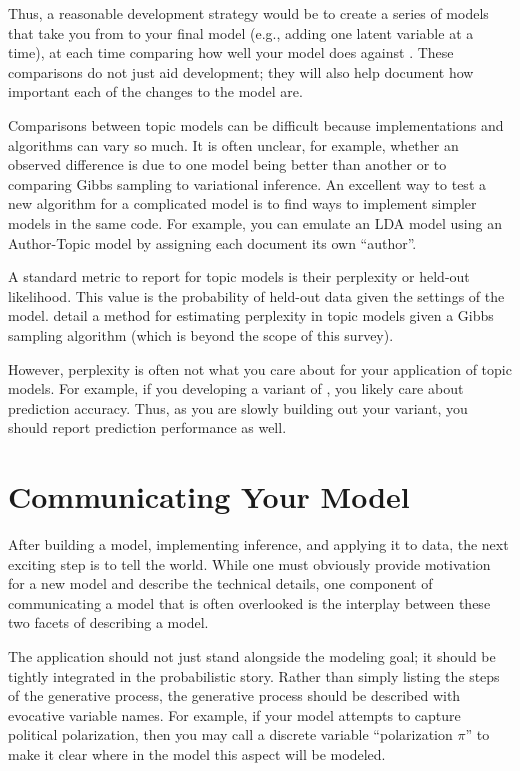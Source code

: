 Thus, a reasonable development strategy would be to create a series of
models that take you from  to your final model (e.g., adding
one latent variable at a time), at each time comparing how well your
model does against .  These comparisons do not just aid
development; they will also help document how important each of the
changes to the model are.

Comparisons between topic models can be difficult because implementations and algorithms can vary so much.
It is often unclear, for example, whether an observed difference is due to one model being better than another or to comparing Gibbs sampling to variational inference.
An excellent way to test a new algorithm for a complicated model is to find ways to implement simpler models in the same code.
For example, you can emulate an LDA model using an Author-Topic model \citep{rosen-zvi-04} by assigning each document its own ``author''.

A standard metric to report for topic models is their perplexity or
held-out likelihood.  This value is the probability of held-out data given
the settings of the model.  \citet{wallach-09a} detail a 
method for estimating perplexity in topic models given a Gibbs sampling algorithm (which is
beyond the scope of this survey).

However, perplexity is often not what you care about for your
application of topic models. For example, if you developing a variant
of , you likely care about prediction accuracy.  Thus, as
you are slowly building out your  variant, you should report
prediction performance as well.

\section{Communicating Your Model}

After building a model, implementing inference, and applying it to
data, the next exciting step is to tell the world.  While one must
obviously provide motivation for a new model and describe the
technical details, one component of communicating a model that is
often overlooked is the interplay between these two facets of
describing a model.

The application should not just stand alongside the modeling goal; it
should be tightly integrated in the probabilistic story.  Rather than
simply listing the steps of the generative process, the generative
process should be described with evocative variable names.  For
example, if your model attempts to capture political polarization,
then you may call a discrete variable ``polarization $\pi$'' to
make it clear where in the model this aspect will be modeled.

